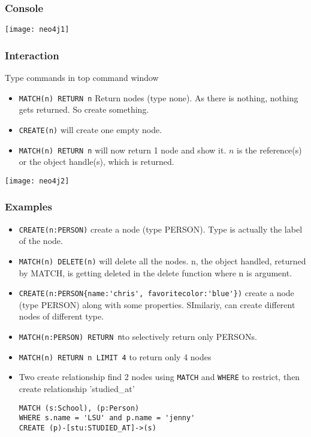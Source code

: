 \begin{frame}[fragile]\frametitle{Console}

\begin{center}
\texttt{[image: neo4j1]}
\end{center}	  


\end{frame}

\begin{frame}[fragile]\frametitle{Interaction}

Type commands in top command window

\begin{itemize}
\item \lstinline|MATCH(n) RETURN n| Return nodes (type none). As there is nothing, nothing gets returned. So create something.
\item \lstinline|CREATE(n)| will create one empty node.
\item \lstinline|MATCH(n) RETURN n| will now return 1 node and show it. $n$ is the reference(s) or the object handle(s), which is returned.
\end{itemize}

\begin{center}
\texttt{[image: neo4j2]}
\end{center}

\end{frame}


\begin{frame}[fragile]\frametitle{Examples}

\begin{itemize}
\item \lstinline|CREATE(n:PERSON)| create a node (type PERSON). Type is actually the label of the node.
\item \lstinline|MATCH(n) DELETE(n)| will delete all the nodes. n, the object handled, returned by MATCH, is getting deleted in the delete function where n is argument. 
\item \lstinline|CREATE(n:PERSON{name:'chris', favoritecolor:'blue'})| create a node (type PERSON) along with some properties. SImilariy, can create different nodes of different type.
\item \lstinline|MATCH(n:PERSON) RETURN n|to selectively return only PERSONs.
\item \lstinline|MATCH(n) RETURN n LIMIT 4| to return only 4 nodes
\item Two create relationship find 2 nodes using \lstinline|MATCH| and \lstinline|WHERE| to restrict, then create relationship 'studied\_at'

\begin{lstlisting}
MATCH (s:School), (p:Person)
WHERE s.name = 'LSU' and p.name = 'jenny'
CREATE (p)-[stu:STUDIED_AT]->(s)
\end{lstlisting}


\end{itemize}

\end{frame}


